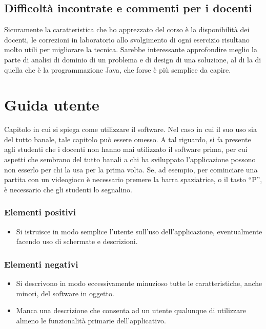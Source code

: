 \documentclass[a4paper,12pt]{report}
\begin{document}
\section{Difficoltà incontrate e commenti per i docenti}

Sicuramente la caratteristica che ho apprezzato del corso è la disponibilità dei docenti, le correzioni in laboratorio allo svolgimento di ogni esercizio risultano molto utili per migliorare la tecnica.
Sarebbe interessante approfondire meglio la parte di analisi di dominio di un problema e di design di una soluzione, al di la di quella che è la programmazione Java, che forse è più semplice da capire.

\appendix
\chapter{Guida utente}

Capitolo in cui si spiega come utilizzare il software. Nel caso in cui il suo uso sia del tutto
banale, tale capitolo può essere omesso.
%
A tal riguardo, si fa presente agli studenti che i docenti non hanno mai utilizzato il software
prima, per cui aspetti che sembrano del tutto banali a chi ha sviluppato l'applicazione possono non
esserlo per chi la usa per la prima volta.
%
Se, ad esempio, per cominciare una partita con un videogioco è necessario premere la barra
spaziatrice, o il tasto ``P'', è necessario che gli studenti lo segnalino.

\subsection*{Elementi positivi}

\begin{itemize}
	\item Si istruisce in modo semplice l'utente sull'uso dell'applicazione, eventualmente facendo uso di schermate e descrizioni.
\end{itemize}

\subsection*{Elementi negativi}
\begin{itemize}
	\item Si descrivono in modo eccessivamente minuzioso tutte le caratteristiche, anche minori, del software in oggetto.
	\item Manca una descrizione che consenta ad un utente qualunque di utilizzare almeno le funzionalità primarie dell'applicativo.
\end{itemize}
\end{document}
